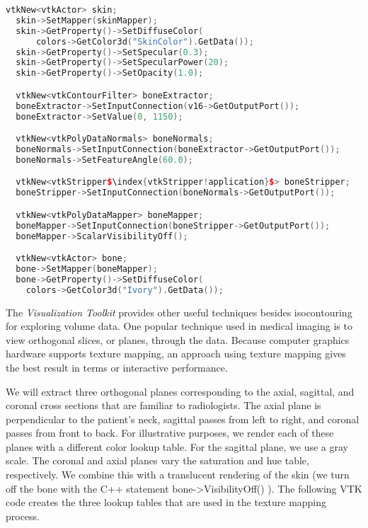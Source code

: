 \begin{lstlisting}[language=C++, caption={Improving the visualization of the isosurface.}, escapechar=\$]
  vtkNew<vtkActor> skin;
  skin->SetMapper(skinMapper);
  skin->GetProperty()->SetDiffuseColor(
      colors->GetColor3d("SkinColor").GetData());
  skin->GetProperty()->SetSpecular(0.3);
  skin->GetProperty()->SetSpecularPower(20);
  skin->GetProperty()->SetOpacity(1.0);

  vtkNew<vtkContourFilter> boneExtractor;
  boneExtractor->SetInputConnection(v16->GetOutputPort());
  boneExtractor->SetValue(0, 1150);

  vtkNew<vtkPolyDataNormals> boneNormals;
  boneNormals->SetInputConnection(boneExtractor->GetOutputPort());
  boneNormals->SetFeatureAngle(60.0);

  vtkNew<vtkStripper$\index{vtkStripper!application}$> boneStripper;
  boneStripper->SetInputConnection(boneNormals->GetOutputPort());

  vtkNew<vtkPolyDataMapper> boneMapper;
  boneMapper->SetInputConnection(boneStripper->GetOutputPort());
  boneMapper->ScalarVisibilityOff();

  vtkNew<vtkActor> bone;
  bone->SetMapper(boneMapper);
  bone->GetProperty()->SetDiffuseColor(
    colors->GetColor3d("Ivory").GetData());
\end{lstlisting}

\noindent The \emph{Visualization Toolkit} provides other useful techniques besides isocontouring for exploring volume data. One popular technique used in medical imaging is to view orthogonal slices, or planes, through the data. Because computer graphics hardware supports texture mapping, an approach using texture mapping gives the best result in terms or interactive performance.

We will extract three orthogonal planes corresponding to the axial, sagittal, and coronal cross sections that are familiar to radiologists. The axial plane is perpendicular to the patient's neck, sagittal passes from left to right, and coronal passes from front to back. For illustrative purposes, we render each of these planes with a different color lookup table. For the sagittal plane, we use a gray scale. The coronal and axial planes vary the saturation and hue table, respectively. We combine this with a translucent rendering of the skin (we turn off the bone with the C++ statement bone->VisibilityOff() ). The following VTK code creates the three lookup tables that are used in the texture mapping process.

